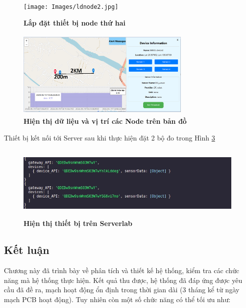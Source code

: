 \documentclass{article} %
\begin{document}
	\begin{figure}[!ht]
		\centering
		\texttt{[image: Images/ldnode2.jpg]}
		\caption[ Lắp đặt thiết bị node thứ hai ]{\bfseries \fontsize{12pt}{0pt}\selectfont Lắp đặt thiết bị node thứ hai}
		\label{ldnode2}
	\end{figure}
	
	\begin{figure}[!ht]
		\centering
		\includegraphics[width=8.5cm,height=4.3cm]{Images/KGHP.png}
		\caption[ Hiện thị dữ liệu và vị trí các Node trên bản đồ ]{\bfseries \fontsize{12pt}{0pt}\selectfont Hiện thị dữ liệu và vị trí các Node trên bản đồ}
		\label{KGHP}
	\end{figure}
	
	\newpage
	Thiết bị kết nối tới Server sau khi thực hiện đặt 2 bộ đo trong Hình \ref{htserver}
	
	\begin{figure}[!ht]
		\centering
		\includegraphics[width=12cm,height=3.6cm]{Images/htserver.png}
		\caption[ Hiện thị thiết bị trên Serverlab]{\bfseries \fontsize{12pt}{0pt}\selectfont Hiện thị thiết bị trên Serverlab}
		\label{htserver}
	\end{figure}
	
	
	\newpage
	\subsection{Kết luận}
	
	Chương này đã trình bày về phân tích và thiết kế hệ thống, kiểm tra các chức năng mà hệ thống thực hiện. Kết quả thu được, hệ thống đã đáp ứng được yêu cầu đã đề ra, mạch hoạt động ổn định trong thời gian dài (3 tháng kể từ ngày mạch PCB hoạt động). Tuy nhiên còn một số chức năng có thể tối ưu như:
	
\end{document}
